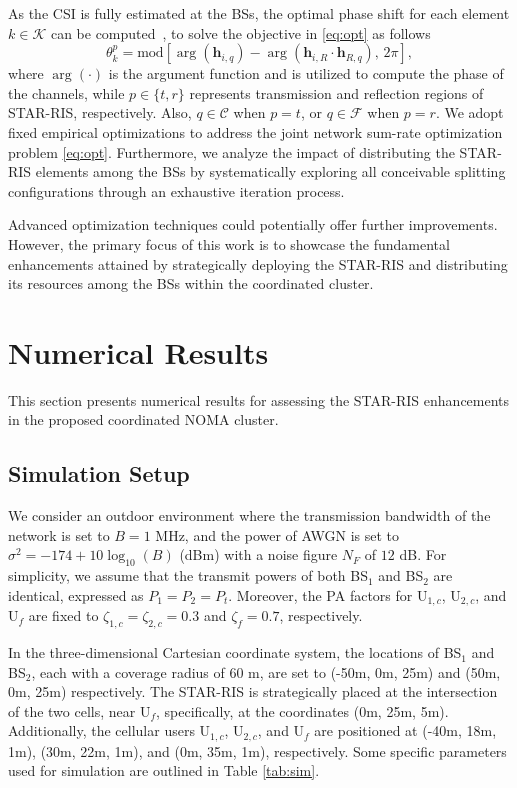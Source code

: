 \documentclass[conference]{IEEEtran}
\begin{document}
As the CSI is fully estimated at the BSs, the optimal phase shift for each element $k \in \mathcal{K}$ can be computed~\cite{wu2019intelligent}, to solve the objective in \ref{eq:opt} as follows
\begin{equation}
    \theta_k^p = \text{mod}[\arg(\textbf{h}_{i,q}) - \arg(\textbf{h}_{i,R}\cdot \textbf{h}_{R, q}),\,2\pi],
\end{equation}
where $\arg(\cdot)$ is the argument function and is utilized to compute the phase of the channels, while $p \in \{t, r\}$ represents transmission and reflection regions of STAR-RIS, respectively. Also, $q \in \mathcal{C}$ when $p=t$, or $q \in \mathcal{F}$ when $p=r$. We adopt fixed empirical optimizations to address the joint network sum-rate optimization problem \ref{eq:opt}. Furthermore, we analyze the impact of distributing the STAR-RIS elements among the BSs by systematically exploring all conceivable splitting configurations through an exhaustive iteration process.

Advanced optimization techniques could potentially offer further improvements. However, the primary focus of this work is to showcase the fundamental enhancements attained by strategically deploying the STAR-RIS and distributing its resources among the BSs within the coordinated cluster.

\section{Numerical Results}
This section presents numerical results for assessing the STAR-RIS enhancements in the proposed coordinated NOMA cluster.
\subsection{Simulation Setup}
We consider an outdoor environment where the transmission bandwidth of the network is set to $B = 1$ MHz, and the power of AWGN is set to $\sigma^2 = -174 + 10\log_{10}\left(B\right)$ (dBm) with a noise figure $N_F$ of $12$ dB. For simplicity, we assume that the transmit powers of both BS$_1$ and BS$_2$ are identical, expressed as $P_1 = P_2 = P_t$. Moreover, the PA factors for U$_{1,c}$, U$_{2,c}$, and U$_f$ are fixed to $\zeta_{1,c}=\zeta_{2,c}=0.3$ and $\zeta_f=0.7$, respectively.

In the three-dimensional Cartesian coordinate system, the locations of BS$_1$ and BS$_2$, each with a coverage radius of 60 m, are set to (-50m, 0m, 25m) and (50m, 0m, 25m) respectively. The STAR-RIS is strategically placed at the intersection of the two cells, near U$_f$, specifically, at the coordinates (0m, 25m, 5m). Additionally, the cellular users U$_{1,c}$, U$_{2,c}$, and U$_f$ are positioned at (-40m, 18m, 1m), (30m, 22m, 1m), and (0m, 35m, 1m), respectively. Some specific parameters used for simulation are outlined in Table \ref{tab:sim}.
\end{document}
